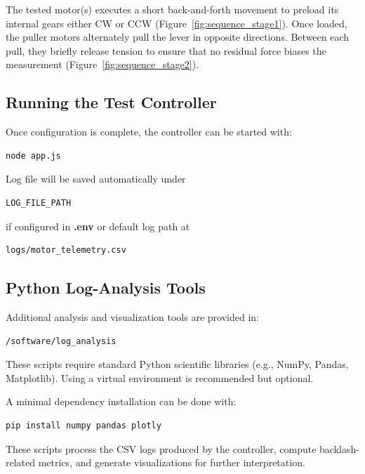 \documentclass[11pt,letterpaper]{article}
\begin{document}
The tested motor(s) executes a short back-and-forth movement to preload its internal gears either CW or CCW (Figure~\ref{fig:sequence_stage1}). Once loaded, the puller motors alternately pull the lever in opposite directions. Between each pull, they briefly release tension to ensure that no residual force biases the measurement (Figure~\ref{fig:sequence_stage2}).

\FloatBarrier

\subsection{Running the Test Controller}
\label{subsec:running-controller}

Once configuration is complete, the controller can be started with:

\begin{lstlisting}[language=bash]
    node app.js
\end{lstlisting}

Log file will be saved automatically under
\begin{verbatim}
LOG_FILE_PATH
\end{verbatim}

if configured in \textbf{.env} or default log path at 
\begin{verbatim}
logs/motor_telemetry.csv
\end{verbatim}

\subsection{Python Log-Analysis Tools}
\label{subsec:python-tools}

Additional analysis and visualization tools are provided in:

\begin{verbatim}
/software/log_analysis
\end{verbatim}

These scripts require standard Python scientific libraries (e.g., NumPy, Pandas, Matplotlib). Using a virtual environment is recommended but optional.

A minimal dependency installation can be done with:

\begin{lstlisting}[language=bash]
    pip install numpy pandas plotly
\end{lstlisting}

These scripts process the CSV logs produced by the controller, compute backlash-related metrics, and generate visualizations for further interpretation.
\end{document}
